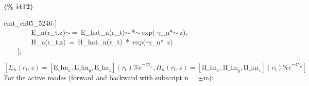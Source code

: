 \documentclass[fleqn]{article}
\begin{document}
\noindent
\begin{minipage}[t]{4.000000em}\color{red}\bfseries
(\% i412)	
\end{minipage}
\begin{minipage}[t]{\textwidth}\color{blue}
cmt\_ch05\_5246:[\\
\ \ \ \ \ \ \ \ E\_n(r\_t,z)\ensuremath{\sim\ }=\ E\_hat\_n(r\_t)\ensuremath{\sim\ }*\ensuremath{\sim\ }exp(-\ensuremath{\gamma}\_n*\ensuremath{\sim\ }z),\\
\ \ \ \ \ \ \ \ H\_n(r\_t,z)\ =\ H\_hat\_n(r\_t)\ *\ exp(-\ensuremath{\gamma}\_n*\ z)\\
\ \ \ \ ];
\end{minipage}
\[\displaystyle \tag{\% o412} 
\operatorname{[}{E_n}\left( {r_t}\operatorname{,}z\right) =\left[ {{\ensuremath{\mathrm{E\_ hn}}}_x}\operatorname{,}{{\ensuremath{\mathrm{E\_ hn}}}_y}\operatorname{,}{{\ensuremath{\mathrm{E\_ hn}}}_z}\right] \left( {r_t}\right)  {{\% e}^{-z {{\gamma }_n}}}\operatorname{,}{H_n}\left( {r_t}\operatorname{,}z\right) =\left[ {{\ensuremath{\mathrm{H\_ hn}}}_x}\operatorname{,}{{\ensuremath{\mathrm{H\_ hn}}}_y}\operatorname{,}{{\ensuremath{\mathrm{H\_ hn}}}_z}\right] \left( {r_t}\right) {{\% e}^{-z {{\gamma }_n}}}\operatorname{]}\mbox{}
\]
For the active modes (forward and backward with subscript n = \ensuremath{\pm}m):
\end{document}
